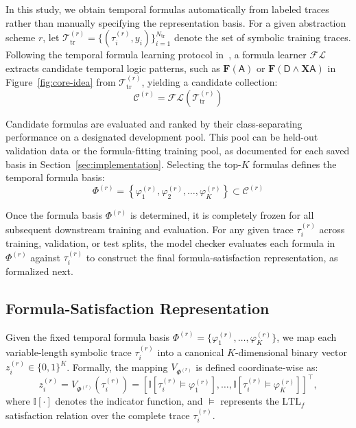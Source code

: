 \documentclass[sigconf,anonymous,nonacm]{acmart}
\newif\ifrevisions
\newcommand{\rev}[1]{\ifrevisions\textcolor{red}{#1}\else#1\fi}
\begin{document}
In this study, we obtain temporal formulas automatically from labeled traces rather than manually specifying the representation basis. For a given abstraction scheme $r$, let $\mathcal{T}_{\text{tr}}^{(r)} = \{(\tau_i^{(r)}, y_i)\}_{i=1}^{N_{\text{tr}}}$ denote the set of symbolic training traces. Following the temporal formula learning protocol in~\cite{wan2024end}, a formula learner $\mathcal{FL}$ extracts candidate temporal logic patterns, \rev{such as $\mathbf{F}(\mathsf{A})$ or $\mathbf{F}(\mathsf{D}\land\mathbf{X}\mathsf{A})$ in Figure~\ref{fig:core-idea}} from $\mathcal{T}_{\text{tr}}^{(r)}$, yielding a candidate collection:
\begin{equation}
    \mathcal{C}^{(r)} = \mathcal{FL}\left(\mathcal{T}_{\text{tr}}^{(r)}\right)
\end{equation}

\rev{Candidate formulas are evaluated and ranked by their class-separating performance on a designated development pool. This pool can be held-out validation data or the formula-fitting training pool, as documented for each saved basis in Section~\ref{sec:implementation}. Selecting the top-$K$ formulas defines the temporal formula basis:}
\begin{equation}
    \Phi^{(r)} = \left\{\varphi_1^{(r)}, \varphi_2^{(r)}, \dots, \varphi_K^{(r)}\right\} \subset \mathcal{C}^{(r)}
\end{equation}

Once the formula basis $\Phi^{(r)}$ is determined, it is completely frozen for all subsequent downstream training and evaluation. For any given trace $\tau_i^{(r)}$ across training, validation, or test splits, the model checker evaluates each formula in $\Phi^{(r)}$ against $\tau_i^{(r)}$ to construct the final formula-satisfaction representation, as formalized next.


\subsection{Formula-Satisfaction Representation}\label{formula_satisfaction_repre}

Given the fixed temporal formula basis $\Phi^{(r)} = \{\varphi_1^{(r)}, \dots, \varphi_K^{(r)}\}$, we map each variable-length symbolic trace $\tau_i^{(r)}$ into a canonical $K$-dimensional binary vector $z_i^{(r)} \in \{0, 1\}^K$. Formally, the mapping $V_{\Phi^{(r)}}$ is defined coordinate-wise as:
\begin{equation}
    z_i^{(r)} = V_{\Phi^{(r)}}\left(\tau_i^{(r)}\right) = \left[ \mathbb{I}\left[\tau_i^{(r)} \models \varphi_1^{(r)}\right], \dots, \mathbb{I}\left[\tau_i^{(r)} \models \varphi_K^{(r)}\right] \right]^\top,
\end{equation}
where $\mathbb{I}[\cdot]$ denotes the indicator function, and $\models$ represents the $\text{LTL}_f$ satisfaction relation over the complete trace $\tau_i^{(r)}$.
\end{document}

